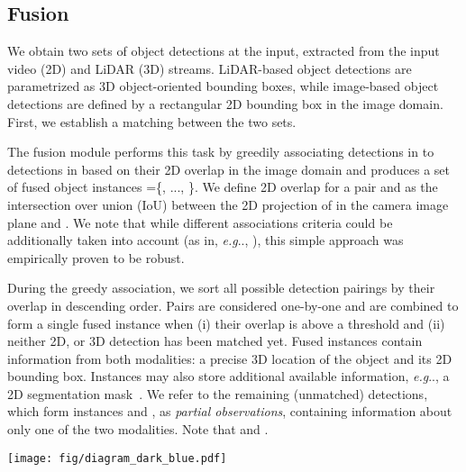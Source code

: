 \documentclass[letterpaper, 10 pt, conference]{ieeeconf}
\makeatletter
\DeclareRobustCommand\onedot{\futurelet\@let@token\@onedot}
\def\@onedot{\ifx\@let@token.\else.\null\fi\xspace}
\def\eg{\emph{e.g}\onedot} \def\Eg{\emph{E.g}\onedot}
\makeatother
\begin{document}
\subsection{Fusion} \label{subsection:fusion}

We obtain two sets of object detections at the input, extracted from the input video (2D) and LiDAR (3D) streams. 
LiDAR-based object detections  are parametrized as 3D object-oriented bounding boxes, while image-based object detections  are defined by a rectangular 2D bounding box in the image domain. First, we establish a matching between the two sets. 


The fusion module performs this task by greedily associating detections in  to detections in  based on their 2D overlap in the image domain and produces a set of fused object instances =\{, ..., \}. 
We define 2D overlap for a pair  and  as the intersection over union (IoU) between the 2D projection of  in the camera image plane and . We note that while different associations criteria could be additionally taken into account (as in, \eg, \cite{Osep17ICRA}), this simple approach was empirically proven to be robust. 

During the greedy association, we sort all possible detection pairings by their overlap in descending order. 
Pairs are considered one-by-one and are combined to form a single fused instance  when (i) their overlap is above a threshold  and (ii) neither 2D, or 3D detection has been matched yet. 
Fused instances  contain information from both modalities: a precise 3D location of the object and its 2D bounding box. Instances may also store additional available information, \eg, a 2D segmentation mask~\cite{Voigtlaender19CVPR}.  
We refer to the remaining (unmatched) detections, which form instances  and , as \textit{partial observations}, containing information about only one of the two modalities. Note that    and   .

\begin{figure*}[ht] 
\vspace{+8pt}
\begin{center}
   \texttt{[image: fig/diagram\_dark\_blue.pdf]}
\end{center}
\vspace{-7pt}
   \caption{A high-level overview of our tracking framework: at the input, we obtain object detections from different sensor modalities, \eg, an image-based detector/segmentation model and a LiDAR/stereo-based 3D object detector. We then fuse these detections into fused object instances, parameterized jointly in 3D and/or 2D space. We then pass them through a two-stage association procedure that allows us to update object tracks, even if detections originating only from one sensor modality are available. 
In the \textit{first stage}, instances with 3D information (with/without 2D information) are matched to existing tracks. In the \textit{second association stage}, unmatched tracks from the previous step  are matched with instances, localized only in 2D. 
   }
   \label{fig:diagram}
\end{figure*}
\end{document}
